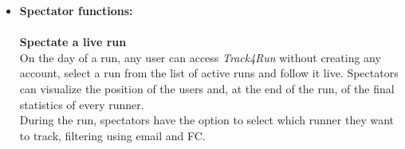 \documentclass[titlepage]{article}
\begin{document}
\begin{itemize}
{\bf Organize new runs} \\
{\it Track4Run} gives organizers, using a {\it Third Party} account, the possibility to create a run and get data from participants. When creating a run, organizers have to define the path that the run will follow on a map, set the starting time and ending time of the event and the maximum number of participants. When a run is full no more runners can join it.\\
Throughout the event, organizers have access to live data of all participants, and can save that data after the event has finished.\\

	\item{\bf Spectator functions: }\\
	\\
	{\bf Spectate a live run} \\
	On the day of a run, any user can access {\it Track4Run} without creating any account, select a run from the list of active runs and follow it live. Spectators can visualize the position of the users and, at the end of the run, of the final statistics of every runner.\\
During the run, spectators have the option to select which runner they want to track, filtering using email and FC.\\
	\end{itemize}
	
\end{document}
